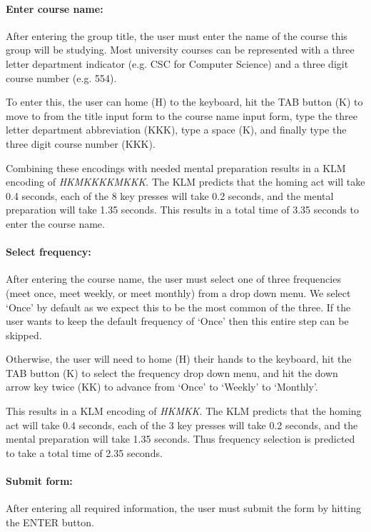 \documentclass[conference]{IEEEtran}
\begin{document}
\paragraph{Enter course name:}
After entering the group title, the user must enter the name of the course this group will be studying.
Most university courses can be represented with a three letter department indicator (e.g. CSC for Computer Science) and a three digit course number (e.g. 554).

To enter this, the user can home (H) to the keyboard, hit the TAB button (K) to move to from the title input form to the course name input form, type the three letter department abbreviation (KKK), type a space (K), and finally type the three digit course number (KKK).

Combining these encodings with needed mental preparation results in a KLM encoding of \emph{HKMKKKKMKKK}.
The KLM predicts that the homing act will take 0.4 seconds, each of the 8 key presses will take 0.2 seconds, and the mental preparation will take 1.35 seconds.
This results in a total time of 3.35 seconds to enter the course name.

\paragraph{Select frequency:}
After entering the course name, the user must select one of three frequencies (meet once, meet weekly, or meet monthly) from a drop down menu.
We select `Once' by default as we expect this to be the most common of the three.
If the user wants to keep the default frequency of `Once' then this entire step can be skipped.

Otherwise, the user will need to home (H) their hands to the keyboard, hit the TAB button (K) to select the frequency drop down menu, and hit the down arrow key twice (KK) to advance from `Once' to `Weekly' to `Monthly'.

This results in a KLM encoding of \emph{HKMKK}.
The KLM predicts that the homing act will take 0.4 seconds, each of the 3 key presses will take 0.2 seconds, and the mental preparation will take 1.35 seconds.
Thus frequency selection is predicted to take a total time of 2.35 seconds.

\paragraph{Submit form:}
After entering all required information, the user must submit the form by hitting the ENTER button.
\end{document}
